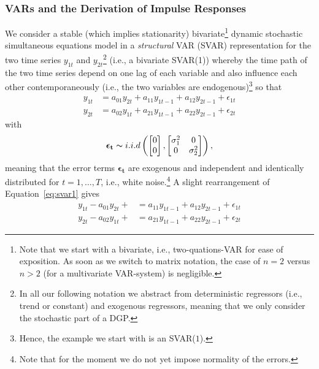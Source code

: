 \documentclass[a4paper,11pt,listof=nochaptergap,oneside,pointednumbers,bibtotoc,bigheadings,liststotoc]{scrbook}
\theoremstyle{mysatz}
\theoremstyle{mydefinition}
\theoremstyle{mybemerkung}
\renewcommand*{\paragraph}[1]{\subsubsection*{#1} \vspace{-3mm}} %
\newcommand{\vect}[1]{\boldsymbol{\mathbf{#1}}}
\begin{document}
\paragraph{VARs and the Derivation of Impulse Responses}
We consider a stable (which implies stationarity) bivariate\footnote{Note that we start with a bivariate, i.e., two-quations-VAR for ease of exposition. As soon as we switch to matrix notation, the case of $n=2$ versus $n>2$ (for a multivariate VAR-system) is negligible.} dynamic stochastic simultaneous equations model in a \textit{structural} VAR (SVAR) representation for the two time series $y_{1t}$ and $y_{2t}$\footnote{In all our following notation we abstract from deterministic regressors (i.e., trend or constant) and exogenous regressors, meaning that we only consider the stochastic part of a DGP.} (i.e., a bivariate SVAR(1)) whereby the time path of the two time series depend on one lag of each variable and also influence each other contemporaneously (i.e., the two variables are endogenous)\footnote{Hence, the example we start with is an SVAR($1$).} so that
\begin{equation} \label{eq:svar1}
\begin{split}
	y_{1t} & = a_{01}y_{2t} + a_{11}y_{1t-1} + a_{12}y_{2t-1} + \epsilon_{1t} \\
	y_{2t} & = a_{02}y_{1t} + a_{21}y_{1t-1} + a_{22}y_{2t-1} + \epsilon_{2t}
\end{split}								
\end{equation}
with 
\begin{equation}
\begin{split}
	\vect{\epsilon_t} \thicksim i.i.d \left (  \begin{bmatrix}
    							0 \\
    							0
 							 \end{bmatrix}, \begin{bmatrix}
    							\sigma_{1}^2 & 0  \\
    							0 & \sigma_{2}^2
 							 \end{bmatrix} \right ),
\end{split}								
\end{equation}
meaning that the error terms $\vect{\epsilon_t}$ are exogenous and independent and identically distributed  for $t = 1, \dots, T$, i.e., white noise.\footnote{Note that for the moment we do not yet impose normality of the errors.} A slight rearrangement of Equation~\ref{eq:svar1} gives 
\begin{equation} \label{eq:svar2}
\begin{split}
	y_{1t} - a_{01}y_{2t} + & = a_{11}y_{1t-1} + a_{12}y_{2t-1} + \epsilon_{1t} \\
	y_{2t} - a_{02}y_{1t} +  & = a_{21}y_{1t-1} + a_{22}y_{2t-1} + \epsilon_{2t}
\end{split}								
\end{equation}
\end{document}
